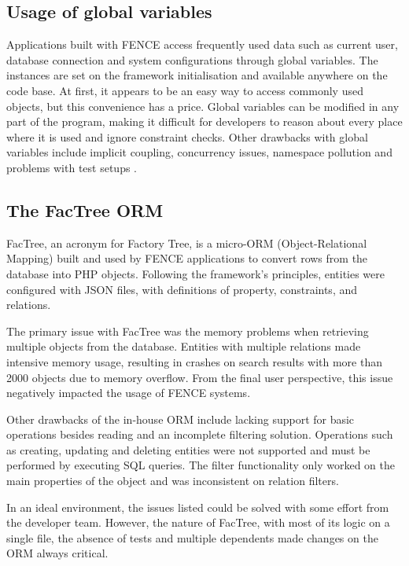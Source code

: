 \subsection{Usage of global variables}
\label{sec:global-variables}

Applications built with FENCE access frequently used data such as current user, database connection and system configurations through global variables. The instances are set on the framework initialisation and available anywhere on the code base. At first, it appears to be an easy way to access commonly used objects, but this convenience has a price. Global variables can be modified in any part of the program, making it difficult for developers to reason about every place where it is used and ignore constraint checks. Other drawbacks with global variables include implicit coupling, concurrency issues, namespace pollution and problems with test setups \cite{rishikesh}.

\subsection{The FacTree ORM}

FacTree, an acronym for Factory Tree, is a micro-ORM (Object-Relational Mapping) built and used by FENCE applications to convert rows from the database into PHP objects. Following the framework's principles, entities were configured with JSON files, with definitions of property, constraints, and relations.

The primary issue with FacTree was the memory problems when retrieving multiple objects from the database. Entities with multiple relations made intensive memory usage, resulting in crashes on search results with more than 2000 objects due to memory overflow. From the final user perspective, this issue negatively impacted the usage of FENCE systems.

Other drawbacks of the in-house ORM include lacking support for basic operations besides reading and an incomplete filtering solution. Operations such as creating, updating and deleting entities were not supported and must be performed by executing SQL queries. The filter functionality only worked on the main properties of the object and was inconsistent on relation filters.

In an ideal environment, the issues listed could be solved with some effort from the developer team. However, the nature of FacTree, with most of its logic on a single file, the absence of tests and multiple dependents made changes on the ORM always critical.

